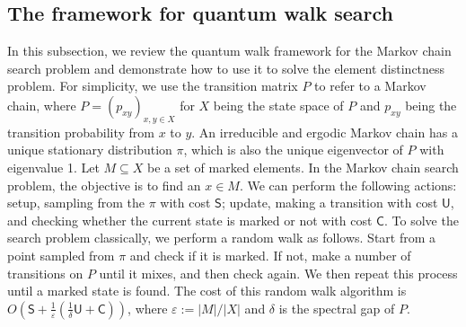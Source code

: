 \subsection{The framework for quantum walk search}
\label{sec:qw-framework}
In this subsection, we review the quantum walk framework for the Markov chain search problem and demonstrate how to use it to solve the element distinctness problem. For simplicity, we use the transition matrix $P$ to refer to a Markov chain, where $P = (p_{xy})_{x, y \in X}$ for $X$ being the state space of $P$ and $p_{xy}$ being the transition probability from $x$ to $y$. An irreducible and ergodic Markov chain has a unique stationary distribution $\pi$, which is also the unique eigenvector of $P$ with eigenvalue 1. Let $M \subseteq X$ be a set of marked elements. In the Markov chain search problem, the objective is to find an $x \in M$. We can perform the following actions: setup, sampling from the $\pi$ with cost $\mathsf{S}$; update, making a transition with cost $\mathsf{U}$, and checking whether the current state is marked or not with cost $\mathsf{C}$. To solve the search problem classically, we perform a random walk as follows. Start from a point sampled from $\pi$ and check if it is marked. If not, make a number of transitions on $P$ until it mixes, and then check again. We then repeat this process until a marked state is found. The cost of this random walk algorithm is $O(\mathsf{S} + \frac{1}{\varepsilon}(\frac{1}{\delta}\mathsf{U} + \mathsf{C}))$, where $\varepsilon:= |M|/|X|$ and $\delta$ is the spectral gap of $P$.

